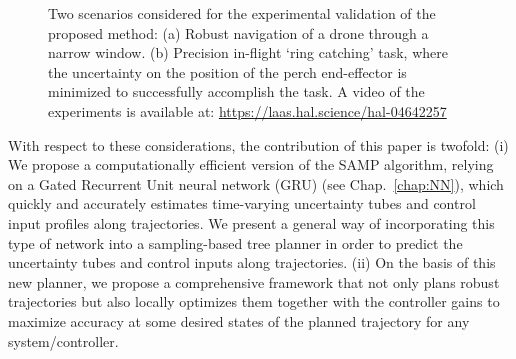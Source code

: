 \begin{figure} [t]
    \centering
    \caption{
    Two scenarios considered for the experimental validation of the proposed method:
    (a) Robust navigation of a drone through a narrow window. (b) Precision in-flight `ring catching' task, where the uncertainty on the position of the perch end-effector is minimized to successfully accomplish the task.
    A video of the experiments is available at: \href{https://laas.hal.science/hal-04642257}{https://laas.hal.science/hal-04642257} \vspace{-0.4cm}}%
    \label{fig: Missed and succes}%
\end{figure}

With respect to these considerations, the contribution of this paper is twofold:
(i) We propose a computationally efficient version of the SAMP algorithm,
relying on a Gated Recurrent Unit neural network (GRU)\cite{cGRU} (see Chap.~\ref{chap:NN}), which quickly and accurately estimates time-varying uncertainty tubes and control input profiles along trajectories.
We present a general way of incorporating this type of network into a sampling-based tree planner in order to predict the uncertainty tubes and control inputs along trajectories. 
(ii) On the basis of this new planner, 
we propose a comprehensive framework that not only plans robust trajectories but also locally optimizes them together with the controller gains to maximize accuracy at some desired states of the planned trajectory for any system/controller.

